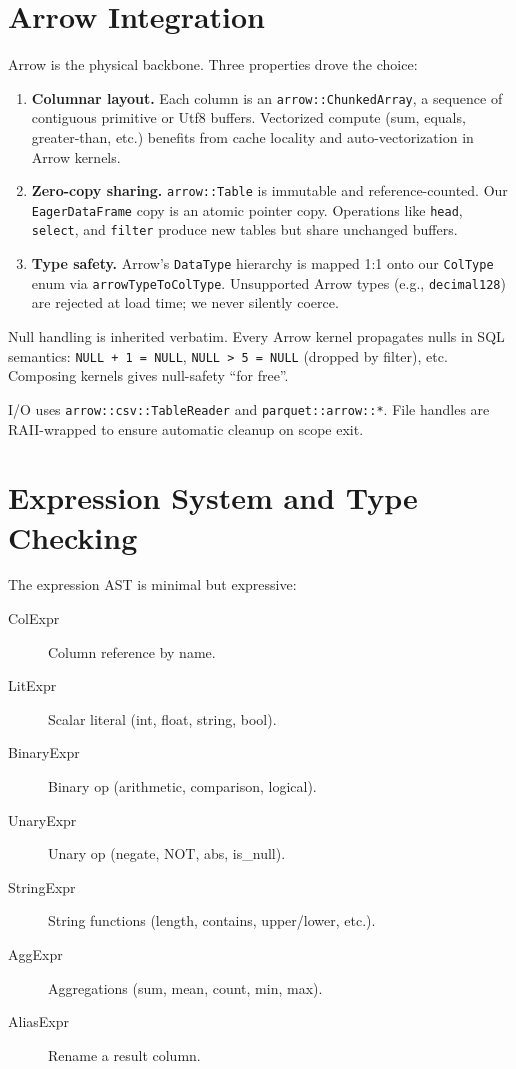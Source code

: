 \documentclass[11pt]{article}
\begin{document}
\section{Arrow Integration}

Arrow is the physical backbone. Three properties drove the choice:

\begin{enumerate}
  \item \textbf{Columnar layout.} Each column is an 
    \texttt{arrow::ChunkedArray}, a sequence of contiguous primitive or 
    Utf8 buffers. Vectorized compute (sum, equals, greater-than, etc.) 
    benefits from cache locality and auto-vectorization in Arrow kernels.
  \item \textbf{Zero-copy sharing.} \texttt{arrow::Table} is immutable and 
    reference-counted. Our \texttt{EagerDataFrame} copy is an atomic pointer 
    copy. Operations like \texttt{head}, \texttt{select}, and \texttt{filter} 
    produce new tables but share unchanged buffers.
  \item \textbf{Type safety.} Arrow's \texttt{DataType} hierarchy is mapped 
    1:1 onto our \texttt{ColType} enum via \texttt{arrowTypeToColType}. 
    Unsupported Arrow types (e.g., \texttt{decimal128}) are rejected at load 
    time; we never silently coerce.
\end{enumerate}

Null handling is inherited verbatim. Every Arrow kernel propagates nulls in SQL 
semantics: \texttt{NULL + 1 = NULL}, \texttt{NULL > 5 = NULL} (dropped by 
filter), etc. Composing kernels gives null-safety ``for free''.

I/O uses \texttt{arrow::csv::TableReader} and 
\texttt{parquet::arrow::*}. File handles are RAII-wrapped to ensure automatic 
cleanup on scope exit.

\section{Expression System and Type Checking}

The expression AST is minimal but expressive:

\begin{description}
  \item[ColExpr] Column reference by name.
  \item[LitExpr] Scalar literal (int, float, string, bool).
  \item[BinaryExpr] Binary op (arithmetic, comparison, logical).
  \item[UnaryExpr] Unary op (negate, NOT, abs, is\_null).
  \item[StringExpr] String functions (length, contains, upper/lower, etc.).
  \item[AggExpr] Aggregations (sum, mean, count, min, max).
  \item[AliasExpr] Rename a result column.
\end{description}
\end{document}
